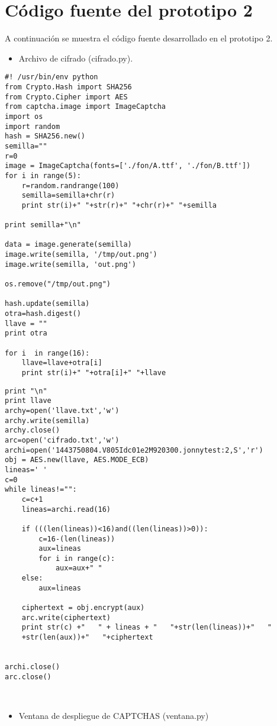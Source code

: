 \appendix
\chapter{Código fuente del prototipo 2}
\label{Anexos A}
A continuación se muestra el código fuente desarrollado en el prototipo 2.
\begin{itemize}
\item Archivo de cifrado (cifrado.py).
\end{itemize}

\begin{lstlisting}[frame=single]
 #! /usr/bin/env python
from Crypto.Hash import SHA256
from Crypto.Cipher import AES
from captcha.image import ImageCaptcha
import os
import random
hash = SHA256.new()
semilla=""
r=0
image = ImageCaptcha(fonts=['./fon/A.ttf', './fon/B.ttf'])
for i in range(5):
	r=random.randrange(100)
	semilla=semilla+chr(r)
	print str(i)+" "+str(r)+" "+chr(r)+" "+semilla
	
print semilla+"\n"

data = image.generate(semilla)
image.write(semilla, '/tmp/out.png')
image.write(semilla, 'out.png')

os.remove("/tmp/out.png")

hash.update(semilla)
otra=hash.digest()
llave = ""
print otra

for i  in range(16):
	llave=llave+otra[i]
	print str(i)+" "+otra[i]+" "+llave
\end{lstlisting}
\begin{lstlisting}[frame=single]
print "\n"
print llave
archy=open('llave.txt','w')
archy.write(semilla)
archy.close()
arc=open('cifrado.txt','w')
archi=open('1443750804.V805Idc01e2M920300.jonnytest:2,S','r')
obj = AES.new(llave, AES.MODE_ECB)
lineas=' '
c=0
while lineas!="": 
	c=c+1
	lineas=archi.read(16)
	
	if (((len(lineas))<16)and((len(lineas))>0)):
		c=16-(len(lineas))
		aux=lineas
		for i in range(c):
			aux=aux+" "
	else:
		aux=lineas
	
	ciphertext = obj.encrypt(aux)
	arc.write(ciphertext)
	print str(c) +"   " + lineas + "   "+str(len(lineas))+"   "
	+str(len(aux))+"   "+ciphertext
	

archi.close()
arc.close()



\end{lstlisting}
\begin{itemize}
\item Ventana de despliegue de CAPTCHAS (ventana.py)
\end{itemize}

